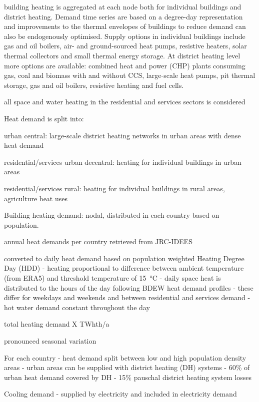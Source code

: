 building heating is aggregated at each node both for individual buildings and district heating.
Demand time series are based on a degree-day representation and improvements to
the thermal envelopes of buildings to reduce demand can also be endogenously
optimised. Supply options in individual buildings include gas and oil boilers,
air- and ground-sourced heat pumps, resistive heaters, solar thermal collectors
and small thermal energy storage. At district heating level more options are
available: combined heat and power (CHP) plants consuming gas, coal and biomass
with and without CCS, large-scale heat pumps, pit thermal storage, gas and oil
boilers, resistive heating and fuel cells.


all space and water heating in the residential and services sectors is considered

Heat demand is split into:

urban central: large-scale district heating networks in urban areas with dense
heat demand

residential/services urban decentral: heating for individual buildings in urban
areas

residential/services rural: heating for individual buildings in rural areas,
agriculture heat uses

Building heating demand: nodal, distributed in each country based on population.

annual heat demands per country retrieved from JRC-IDEES

converted to daily heat demand based on population weighted Heating Degree Day (HDD)
- heating proportional to difference between ambient temperature (from ERA5) and threshold temperature of \SI{15}{\celsius}
- daily space heat is distributed to the hours of the day following BDEW heat demand profiles
- these differ for weekdays and weekends and between residential and services demand
- hot water demand constant throughout the day

total heating demand X TWhth/a

pronounced seasonal variation

For each country
- heat demand split between low and high population density areas
- urban areas can be supplied with district heating (DH) systems
- 60\% of urban heat demand covered by DH
- 15\% pauschal district heating system losses

Cooling demand
- supplied by electricity and included in electricity demand

